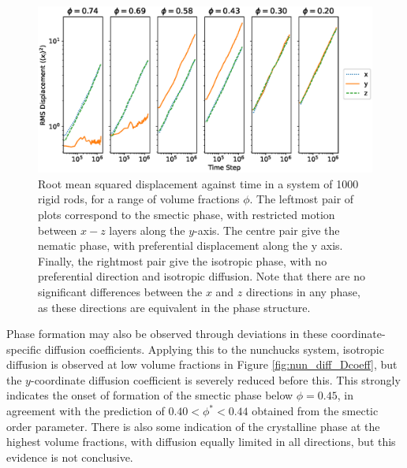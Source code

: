 \documentclass[11pt, a4paper]{article} %
\begin{document}
\begin{figure} [h!]
	\centering
	\includegraphics[width=\linewidth]{Figures/nun_diff_rmsplots}
	\caption{Root mean squared displacement against time in a system of 1000 rigid rods, for a range of volume fractions $\phi$. The leftmost pair of plots correspond to the smectic phase, with restricted motion between $x-z$ layers along the $y$-axis. The centre pair give the nematic phase, with preferential displacement along the y axis. Finally, the rightmost pair give the isotropic phase, with no preferential direction and isotropic diffusion. Note that there are no significant differences between the $x$ and $z$ directions in any phase, as these directions are equivalent in the phase structure.}
	\label{fig:nun_diff_rmsplots}
\end{figure}  %

Phase formation may also be observed through deviations in these coordinate-specific diffusion coefficients. Applying this to the nunchucks system, isotropic diffusion is observed at low volume fractions in Figure \ref{fig:nun_diff_Dcoeff}, but the $y$-coordinate diffusion coefficient is severely reduced before this. This strongly indicates the onset of formation of the smectic phase below $\phi = 0.45$, in agreement with the prediction of $ 0.40<\phi^{*}<0.44$ obtained from the smectic order parameter. There is also some indication of the crystalline phase at the highest volume fractions, with diffusion equally limited in all directions, but this evidence is not conclusive.
\end{document}

